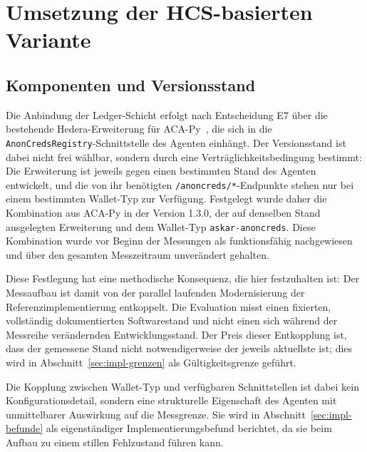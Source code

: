 \section{Umsetzung der HCS-basierten Variante}
\label{sec:impl-hcs}

\subsection{Komponenten und Versionsstand}
\label{subsec:impl-hcs-komponenten}

Die Anbindung der Ledger-Schicht erfolgt nach Entscheidung E7 über die bestehende Hedera-Erweiterung für ACA-Py~\cite{acapyhedera}, die sich in die \texttt{AnonCredsRegistry}-Schnittstelle des Agenten einhängt. Der Versionsstand ist dabei nicht frei wählbar, sondern durch eine Verträglichkeitsbedingung bestimmt: Die Erweiterung ist jeweils gegen einen bestimmten Stand des Agenten entwickelt, und die von ihr benötigten \texttt{/anoncreds/*}-Endpunkte stehen nur bei einem bestimmten Wallet-Typ zur Verfügung. Festgelegt wurde daher die Kombination aus ACA-Py in der Version 1.3.0, der auf denselben Stand ausgelegten Erweiterung und dem Wallet-Typ \texttt{askar-anoncreds}. Diese Kombination wurde vor Beginn der Messungen als funktionsfähig nachgewiesen und über den gesamten Messzeitraum unverändert gehalten.

Diese Festlegung hat eine methodische Konsequenz, die hier festzuhalten ist: Der Messaufbau ist damit von der parallel laufenden Modernisierung der Referenzimplementierung entkoppelt. Die Evaluation misst einen fixierten, vollständig dokumentierten Softwarestand und nicht einen sich während der Messreihe verändernden Entwicklungsstand. Der Preis dieser Entkopplung ist, dass der gemessene Stand nicht notwendigerweise der jeweils aktuellste ist; dies wird in Abschnitt~\ref{sec:impl-grenzen} als Gültigkeitsgrenze geführt.

Die Kopplung zwischen Wallet-Typ und verfügbaren Schnittstellen ist dabei kein Konfigurationsdetail, sondern eine strukturelle Eigenschaft des Agenten mit unmittelbarer Auswirkung auf die Messgrenze. Sie wird in Abschnitt~\ref{sec:impl-befunde} als eigenständiger Implementierungsbefund berichtet, da sie beim Aufbau zu einem stillen Fehlzustand führen kann.


